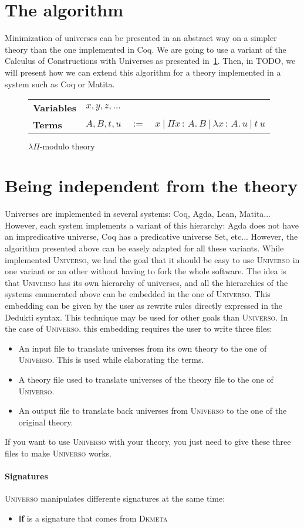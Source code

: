 \documentclass{article}
\newcommand{\lfmt}{\ensuremath{\lambda\Pi\text{-modulo theory}}}
\newcommand{\defn}{\ensuremath{:=}}
\newcommand{\tabs}[3]{\ensuremath{\lambda{#1}\,{:}\,{#2}.\,{#3}}}
\newcommand{\tapp}[2]{\ensuremath{{#1}~{#2}}}
\newcommand{\tpi}[3]{\ensuremath{\Pi{#1}\,{:}\,{#2}.\,{#3}}}
\newcommand{\universo}{\textsc{Universo}}
\newcommand{\dkmeta}{\textsc{Dkmeta}}
\begin{document}
\section{The algorithm}
\label{sec:algo}
Minimization of universes can be presented in an abstract way on a simpler theory than the one implemented in Coq. We are going to use a variant of the Calculus of Constructions with Universes as presented in~\ref{fig:sttsyntax}. Then, in TODO, we will present how we can extend this algorithm for a theory implemented in a system such as Coq or Matita.

\begin{figure}
  \centering
  \begin{tabular}{lccl}
    \textbf{Variables} & \(x,y,z,\dots\) & & \\
    \textbf{Terms} & \(A,B,t,u\) & \(\defn\) & \(x~|~\tpi{x}{A}{B} ~|~\tabs{x}{A}{u} ~|~ \tapp{t}{u} \)\\

  \end{tabular}
  \caption{\lfmt{}}
  \label{fig:sttsyntax}
\end{figure}

\section{Being independent from the theory}

Universes are implemented in several systems: Coq, Agda, Lean, Matita... However, each system implements a variant of this hierarchy: Agda does not have an impredicative universe, Coq has a predicative universe Set, etc... However, the algorithm presented above can be easely adapted for all these variants. While implemented \universo{}, we had the goal that it should be easy to use \universo{} in one variant or an other without having to fork the whole software. The idea is that \universo{} has its own hierarchy of universes, and all the hierarchies of the systems enumerated above can be embedded in the one of \universo. This embedding can be given by the user as rewrite rules directly expressed in the Dedukti syntax. This technique may be used for other goals than \universo{}. In the case of \universo{}. this embedding requires the user to write three files:
\begin{itemize}
\item An input file to translate universes from its own theory to the one of \universo{}. This is used while elaborating the terms.
\item A theory file used to translate universes of the theory file to the one of \universo{}.
\item An output file to translate back universes{} from \universo{} to the one of the original theory.
\end{itemize}

If you want to use \universo{} with your theory, you just need to give these three files to make \universo{} works.

\paragraph{Signatures}

\universo{} manipulates differente signatures at the same time:
\begin{itemize}
\item \textbf{lf} is a signature that comes from \dkmeta{}
\end{itemize}
\end{document}
